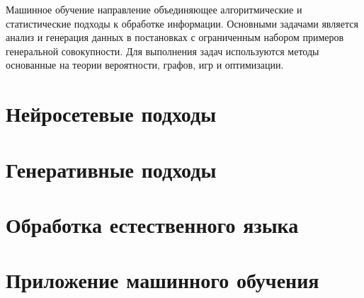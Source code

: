 Машинное обучение направление объединяющее алгоритмические и статистические подходы к обработке информации.
Основными задачами является анализ и генерация данных в постановках с ограниченным набором примеров генеральной совокупности.
Для выполнения задач используются методы основанные на теории вероятности, графов, игр и оптимизации. 

\section{Нейросетевые подходы}



\section{Генеративные подходы}



\section{Обработка естественного языка}



\section{Приложение машинного обучения}



